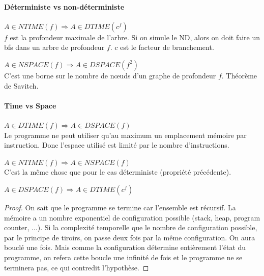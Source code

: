 \paragraph{Déterministe vs non-déterministe}
\begin{myprop}
	$A \in NTIME(f) \Rightarrow A \in DTIME(c^f)$ \\
	$f$ est la profondeur maximale de l'arbre. Si on simule le
	ND, alors on doit faire un bfs dans un arbre de profondeur $f$.
	$c$ est le facteur de branchement.
\end{myprop}

\begin{myprop}
	$A \in NSPACE(f) \Rightarrow A \in DSPACE(f^2)$ \\
	C'est une borne sur le nombre de nœuds d'un graphe de
	profondeur $f$. Théorème de Savitch.
\end{myprop}

\paragraph{Time vs Space}
\begin{myprop}
	$A \in DTIME(f) \Rightarrow A \in DSPACE(f)$ \\
	Le programme ne peut utiliser qu'au maximum un emplacement
	mémoire par instruction. Donc l'espace utilisé est limité par le
	nombre d'instructions.
\end{myprop}

\begin{myprop}
	$A \in NTIME(f) \Rightarrow A \in NSPACE(f)$ \\
	C'est la même chose que pour le cas déterministe (propriété précédente).
\end{myprop}

\begin{myprop}
	$A \in DSPACE(f) \Rightarrow A \in DTIME(c^f)$
    \begin{proof}
      On sait que le programme se termine car l'ensemble est récursif.
      La mémoire a un nombre exponentiel de configuration possible (stack, heap, program counter, ...).
      Si la complexité temporelle que le nombre de configuration possible,
      par le principe de tiroirs, on passe deux fois par la même configuration.
      On aura bouclé une fois.
      Mais comme la configuration détermine entièrement l'état du programme, on refera cette boucle une infinité de fois
      et le programme ne se terminera pas, ce qui contredit l'hypothèse.
    \end{proof}
\end{myprop}

